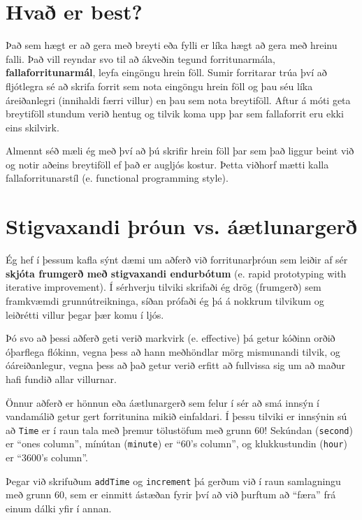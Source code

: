 \section{Hvað er best?}

Það sem hægt er að gera með breyti eða fylli er líka hægt að gera með hreinu falli.
Það vill reyndar svo til að ákveðin tegund forritunarmála, {\bf fallaforritunarmál}, leyfa eingöngu hrein föll.
Sumir forritarar trúa því að fljótlegra sé að skrifa forrit sem nota eingöngu hrein föll og þau séu líka áreiðanlegri (innihaldi færri villur) en þau sem nota breytiföll.
Aftur á móti geta breytiföll stundum verið hentug og tilvik koma upp þar sem fallaforrit eru ekki eins skilvirk.

Almennt séð mæli ég með því að þú skrifir hrein föll þar sem það liggur beint við og notir aðeins breytiföll ef það er augljós kostur.
Þetta viðhorf mætti kalla fallaforritunarstíl (e. functional programming style).

\section{Stigvaxandi þróun vs. áætlunargerð}

Ég hef í þessum kafla sýnt dæmi um aðferð við forritunarþróun sem leiðir af sér {\bf skjóta frumgerð með stigvaxandi endurbótum} (e. rapid prototyping with iterative improvement).
Í sérhverju tilviki skrifaði ég drög (frumgerð) sem framkvæmdi grunnútreikninga, síðan prófaði ég þá á nokkrum tilvikum og leiðrétti villur þegar þær komu í ljós.

Þó svo að þessi aðferð geti verið markvirk (e. effective) þá getur kóðinn orðið óþarflega flókinn, vegna þess að hann meðhöndlar mörg mismunandi tilvik,
og óáreiðanlegur, vegna þess að það getur verið erfitt að fullvissa sig um að maður hafi fundið allar villurnar.

Önnur aðferð er hönnun eða áætlunargerð sem felur í sér að smá innsýn í vandamálið getur gert forritunina mikið einfaldari.
Í þessu tilviki er innsýnin sú að {\tt Time} er í raun tala með þremur tölustöfum með grunn 60!
Sekúndan ({\tt second}) er ``ones column'', mínútan ({\tt minute}) er ``60's column'', og klukkustundin ({\tt hour}) er ``3600's column''.

Þegar við skrifuðum {\tt addTime} og {\tt increment} þá gerðum við í raun samlagningu með grunn 60, sem er einmitt ástæðan fyrir því að við þurftum að ``færa'' frá einum dálki yfir í annan.

